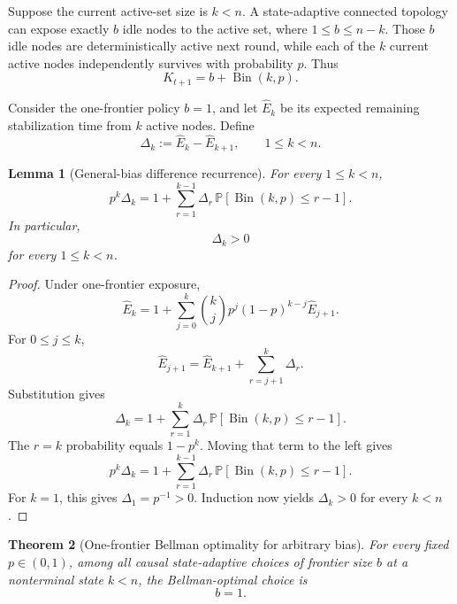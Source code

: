 \documentclass[11pt]{article}
\newtheorem{theorem}{Theorem}
\newtheorem{lemma}[theorem]{Lemma}
\newcommand{\Prb}{\mathbb{P}}
\newcommand{\Bin}{\operatorname{Bin}}
\begin{document}
Suppose the current active-set size is $k<n$.  A state-adaptive connected
topology can expose exactly $b$ idle nodes to the active set, where
$1\le b\le n-k$.  Those $b$ idle nodes are deterministically active next
round, while each of the $k$ current active nodes independently survives with
probability $p$.  Thus
\[
  K_{t+1}=b+\Bin(k,p).
\]

Consider the one-frontier policy $b=1$, and let $\widehat E_k$ be its expected
remaining stabilization time from $k$ active nodes.  Define
\[
  \Delta_k:=\widehat E_k-\widehat E_{k+1},
  \qquad 1\le k<n.
\]

\begin{lemma}[General-bias difference recurrence]
For every $1\le k<n$,
\[
  p^k\Delta_k
  =
  1+
  \sum_{r=1}^{k-1}
  \Delta_r\,
  \Prb[\Bin(k,p)\le r-1].
\]
In particular,
\[
  \Delta_k>0
\]
for every $1\le k<n$.
\end{lemma}

\begin{proof}
Under one-frontier exposure,
\[
  \widehat E_k
  =
  1+
  \sum_{j=0}^{k}
  \binom{k}{j}p^j{(1-p)}^{k-j}\widehat E_{j+1}.
\]
For $0\le j\le k$,
\[
  \widehat E_{j+1}
  =
  \widehat E_{k+1}
  +
  \sum_{r=j+1}^{k}\Delta_r.
\]
Substitution gives
\[
  \Delta_k
  =
  1+
  \sum_{r=1}^{k}
  \Delta_r\,\Prb[\Bin(k,p)\le r-1].
\]
The $r=k$ probability equals $1-p^k$.  Moving that term to the left gives
\[
  p^k\Delta_k
  =
  1+
  \sum_{r=1}^{k-1}
  \Delta_r\,\Prb[\Bin(k,p)\le r-1].
\]
For $k=1$, this gives $\Delta_1=p^{-1}>0$.  Induction now yields
$\Delta_k>0$ for every $k<n$.
\end{proof}

\begin{theorem}[One-frontier Bellman optimality for arbitrary bias]
For every fixed $p\in(0,1)$, among all causal state-adaptive choices of
frontier size $b$ at a nonterminal state $k<n$, the Bellman-optimal choice is
\[
  b=1.
\]
\end{theorem}
\end{document}
